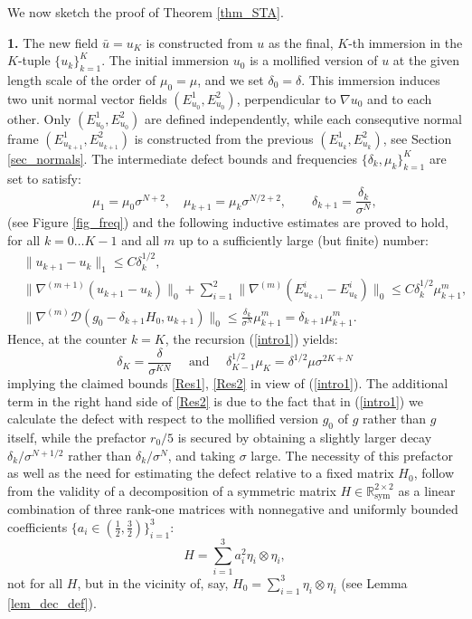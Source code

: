 \documentclass[reqno,twoside,11pt]{amsart}
\newcommand{\sym}{\mathrm{sym}}
\newcommand{\R}{\mathbb{R}}
\numberwithin{equation}{section}
\theoremstyle{plain}
\theoremstyle{definition}
\begin{document}
\noindent We now sketch the proof of Theorem \ref{thm_STA}. 

\medskip

{\bf 1.} The new field $\bar u=u_K$ is constructed from $u$ as the
final, $K$-th immersion in the $K$-tuple $\{u_k\}_{k=1}^K$. 
The initial immersion $u_0$ is a mollified version of $u$ at the
given length scale of the order of $\mu_0=\mu$, and we set $\delta_0 = \delta$. This immersion
induces two unit normal vector fields $(E_{u_0}^1, E_{u_0}^2)$, perpendicular to
$\nabla u_0$ and to each other. Only $(E_{u_0}^1, E_{u_0}^2)$ are
defined independently, while each consequtive normal frame
$(E_{u_{k+1}}^1, E_{u_{k+1}}^2)$ is constructed from the previous
$(E_{u_{k}}^1, E_{u_{k}}^2)$, see Section \ref{sec_normals}. 
The intermediate defect bounds and frequencies
$\{\delta_k,\mu_k\}_{k=1}^K$ are set to satisfy:
\begin{equation}\label{intro0}
\mu_1 = \mu_0\sigma^{N+2}, \quad \mu_{k+1}=\mu_k\sigma^{N/2+2},\qquad
\delta_{k+1}=\frac{\delta_k}{\sigma^N}, 
\end{equation}
(see Figure \ref{fig_freq}) and the following inductive estimates are proved to hold, for
all $k=0\ldots K-1$ and all $m$ up to a sufficiently large (but finite) number:
\begin{equation}\label{intro1}
\begin{split}
& \|u_{k+1} - u_k\|_1\leq C\delta_{k}^{1/2},\\
& \|\nabla^{(m+1)} (u_{k+1} - u_k)\|_0 + \sum_{i=1}^2\|\nabla^{(m)} (E^i_{u_{k+1}} - E^i_{u_k})\|_0\leq 
C\delta_k^{1/2}\mu_{k+1}^m,\\
&\|\nabla^{(m)}\mathcal{D}(g_0-\delta_{k+1}H_0,
u_{k+1})\|_0\leq \frac{\delta_k}{\sigma^N}\mu_{k+1}^m = \delta_{k+1}\mu_{k+1}^m.
\end{split}
\end{equation}
Hence, at the counter $k=K$, the recursion (\ref{intro1}) yields: 
$$\delta_K=\frac{\delta}{\sigma^{KN}} \quad\mbox{ and }\quad 
\delta_{K-1}^{1/2}\mu_K = \delta^{1/2}\mu\sigma^{2K+N}$$
implying the claimed bounds \ref{Res1}, \ref{Res2} in view of (\ref{intro1}). The additional term in
the right hand side of \ref{Res2} is due to the fact that in
(\ref{intro1}) we calculate the defect with respect to the mollified version $g_0$ of $g$ rather than
$g$ itself, while the prefactor $r_0/5$ is secured by obtaining a
slightly larger decay $\delta_{k}/\sigma^{N+1/2}$ rather than
$\delta_k/\sigma^N$, and taking $\sigma$ large. The necessity of this
prefactor as well as the need for estimating the defect relative to a
fixed matrix $H_0$, follow from the validity of a decomposition of
a symmetric matrix
$H\in\R^{2\times 2}_\sym$ as a linear combination of three rank-one matrices
with nonnegative and uniformly bounded coefficients $\{a_i\in
(\frac{1}{2},\frac{3}{2})\}_{i=1}^3$:
\begin{equation}\label{intro2}
H=\sum_{i=1}^3 a_i^2 \eta_i\otimes \eta_i,
\end{equation}
not for all $H$, but in the vicinity of,
say, $H_0=\sum_{i=1}^3 \eta_i\otimes \eta_i$ (see Lemma \ref{lem_dec_def}). 
\end{document}

